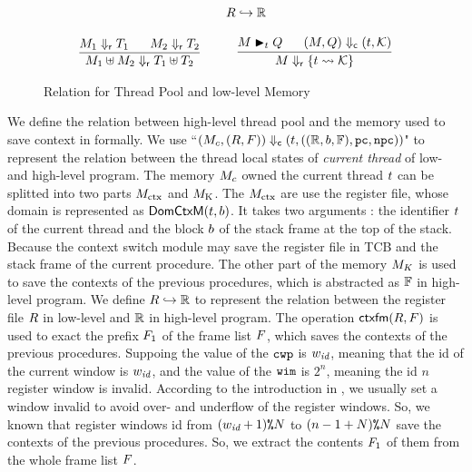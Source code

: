 \begin{figure}[!t]
\[\begin{array}{c}
{\begin{array}{c}
                    \quad \ \ 
                    \Rinj{\RFile}{\hRfile} 
                \end{array}
            } \\
            \\
            \infer
            {
                \rdyStRel{\Mem_1 \uplus \Mem_2}{\thrdpool_1 \uplus \thrdpool_2}
            }
            {
                \rdyStRel{\Mem_1}{\thrdpool_1} \quad \ \ 
                \rdyStRel{\Mem_2}{\thrdpool_2}
            } \qquad \quad
            \infer
            {
                \rdyStRel{\Mem}{\{ \thrdid \rightsquigarrow \hthrdlocalst \}}
            }
            {
                \restoreCtx{\Mem}{\thrdid}{\Rstate} \quad \ \ 
                \curStRel{(\Mem, \Rstate)}{(\thrdid, \hthrdlocalst)}
            }
        \end{array}
    \]
    \caption{Relation for Thread Pool and low-level Memory}
    \label{fig:rel-thrdpool-mem}
    \vspace{-1em}
\end{figure}

We define the relation between high-level thread pool and 
the memory used to save context in \Fig{\ref{fig:rel-thrdpool-mem}} formally. We use 
``${(M_c, (R, F))} \Downarrow_{\textsf{c}} {(t, ((\mathbb{R}, b, \mathbb{F}), \texttt{pc}, \texttt{npc}))}$" 
to represent the relation between the thread local states of 
{\it current thread} of low- and high-level program. 
The memory $M_c$ owned the current thread $t$ can be 
splitted into two parts $M_{\text{ctx}}$ and $M_{\text{K}}$. The 
$M_{\text{ctx}}$ are use the register file, whose domain is represented as 
$\textsf{DomCtxM}{(t, b)}$. It takes two arguments : the identifier $t$ 
of the current thread and the block $b$ of the stack frame at the top of the stack. 
Because the context switch module may save the register file in TCB and 
the stack frame of the current procedure. The other part of the memory $M_K$ 
is used to save the contexts of the previous procedures, which is abstracted 
as $\mathbb{F}$ in high-level program. We define ${R}\hookrightarrow{\mathbb{R}}$ to 
represent the relation between the register file $R$ in low-level and 
$\mathbb{R}$ in high-level program. The operation $\textsf{ctxfm}(R, F)$ is 
used to exact the prefix $F_1$ of the frame list $F$, which saves 
the contexts of the previous procedures. Suppoing the value of the $\texttt{cwp}$ 
is $w_{\textit{id}}$, meaning that the id of the current window is $w_{\textit{id}}$, 
and the value of the $\texttt{wim}$ is $2^n$, meaning the id $n$ register window 
is invalid. According to the introduction in \Fig{\ref{subsec:syntax}}, 
we usually set a window invalid to avoid over- and underflow of the 
register windows. So, we known that register windows id from $(w_{\textit{id}} + 1)\texttt{\%}{N}$ 
to $(n - 1 + N)\texttt{\%}{N}$ save the contexts of the previous procedures. 
So, we extract the contents $F_1$ of them from the whole frame list $F$. 

